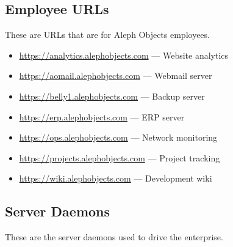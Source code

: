 \subsection{Employee URLs}
These are URLs that are for Aleph Objects employees.

\begin{itemize}
\item \url{https://analytics.alephobjects.com} --- Website analytics
\item \url{https://aomail.alephobjects.com} --- Webmail server
\item \url{https://belly1.alephobjects.com} --- Backup server
\item \url{https://erp.alephobjects.com} --- ERP server
\item \url{https://ops.alephobjects.com} --- Network monitoring
\item \url{https://projects.alephobjects.com} --- Project tracking
\item \url{https://wiki.alephobjects.com} --- Development wiki
\end{itemize}

\subsection{Server Daemons}
These are the server daemons used to drive the enterprise.

